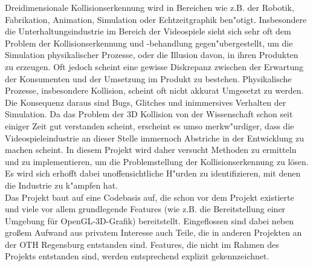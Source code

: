 
Dreidimensionale Kollisionserkennung wird in Bereichen wie z.B. der Robotik, Fabrikation, Animation, Simulation oder Echtzeitgraphik ben"otigt.
Insbesondere die Unterhaltungsindustrie im Bereich der Videospiele sieht sich sehr oft dem Problem der Kollisionserkennung und -behandlung gegen"ubergestellt, um die Simulation physikalischer Prozesse, oder die Illusion davon, in ihren Produkten zu erzeugen.
Oft jedoch scheint eine gewisse Diskrepanz zwischen der Erwartung der Konsumenten und der Umsetzung im Produkt zu bestehen. Physikalische Prozesse, insbesondere Kollision, scheint oft nicht akkurat Umgesetzt zu werden. Die Konsequenz daraus sind Bugs, Glitches und inimmersives Verhalten der Simulation.
Da das Problem der 3D Kollision von der Wissenschaft schon seit einiger Zeit gut verstanden scheint, erscheint es umso merkw"urdiger, dass die Videospieleindustrie an dieser Stelle immernoch Abstriche in der Entwicklung zu machen scheint.
In diesem Projekt wird daher versucht Methoden zu ermitteln und zu implementieren, um die Problemstellung der Kollisionserkennung zu lösen.
Es wird sich erhofft dabei unoffensichtliche H"urden zu identifizieren, mit denen die Industrie zu k"ampfen hat. \\
Das Projekt baut auf eine Codebasis auf, die schon vor dem Projekt existierte und viele vor allem grundlegende Features (wie z.B. die Bereitstellung einer Umgebung für OpenGL-3D-Grafik) bereitstellt. Eingeflossen sind dabei neben großem Aufwand aus privatem Interesse auch Teile, die in anderen Projekten an der OTH Regensburg entstanden sind. Features, die nicht im Rahmen des Projekts entstanden sind, werden entsprechend explizit gekennzeichnet.